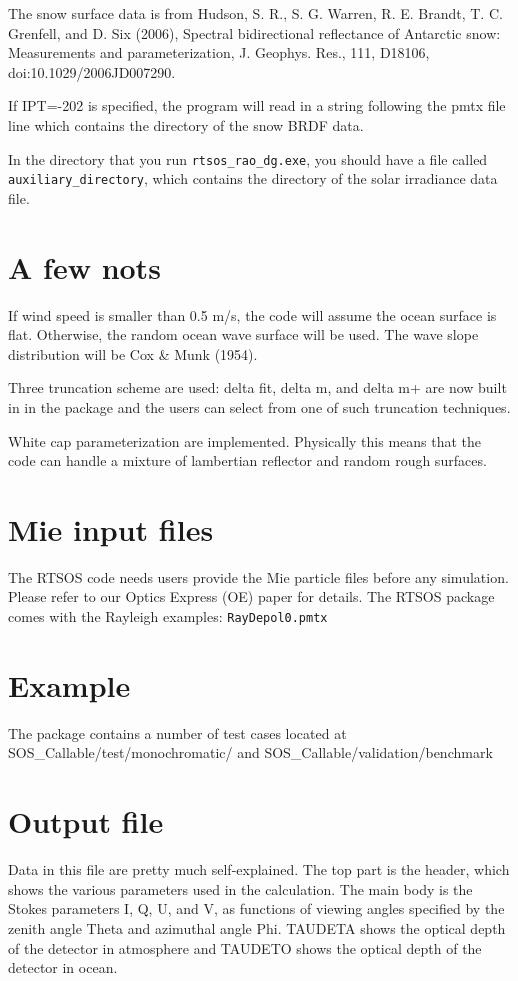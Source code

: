 \documentclass[10pt,letterpaper]{article}
\begin{document}
The snow surface data is from
Hudson, S. R., S. G. Warren, R. E. Brandt, T. C. Grenfell, and D. Six (2006), Spectral bidirectional reflectance of Antarctic snow: Measurements and parameterization, J. Geophys. Res., 111, D18106, doi:10.1029/2006JD007290.

If IPT=-202 is specified, the program will read in a string following the pmtx file line which contains the directory of the snow BRDF data.

In the directory that you run \verb!rtsos_rao_dg.exe!, you should have a file called \verb!auxiliary_directory!, which contains the directory of the solar irradiance data file.

\section{A few nots}

If wind speed is smaller than 0.5 m/s, the code will assume the ocean surface is flat.  Otherwise, the random ocean wave surface will be used.  The wave slope distribution will be Cox \& Munk (1954).

Three truncation scheme are used: delta fit, delta m, and delta m+ are now built in in the package and the users can select from one of such truncation techniques.

White cap parameterization are implemented.  Physically this means that the code can handle a mixture of lambertian reflector and random rough surfaces.

\section{ Mie input files}
The RTSOS code needs users provide the Mie particle files before any simulation.  Please refer to our Optics Express (OE) paper for details.  The RTSOS package comes with the Rayleigh examples: \verb"RayDepol0.pmtx"


\section{Example}
The package contains a number of test cases located at
SOS\_Callable/test/monochromatic/
and 
SOS\_Callable/validation/benchmark

 
\section{Output file}
Data in this file are pretty much self-explained.  The top part is the header, which shows the various parameters used in the calculation.  The main body is the Stokes parameters I, Q, U, and V, as functions of viewing angles specified by the zenith angle Theta and azimuthal angle Phi.  TAUDETA shows the optical depth of the detector in atmosphere and TAUDETO shows the optical depth of the detector in ocean.
\end{document}
